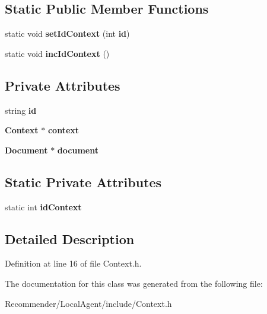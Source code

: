 \subsection*{Static Public Member Functions}
\begin{CompactItemize}
\item 
static void \textbf{setIdContext} (int {\bf id})\label{classbr_1_1ufscar_1_1lince_1_1ginga_1_1recommender_1_1Context_8450c7ac7b36d83513acd3d2ec94457c}

\item 
static void \textbf{incIdContext} ()\label{classbr_1_1ufscar_1_1lince_1_1ginga_1_1recommender_1_1Context_d6d7a38af7e7c56f8d877a2143e00abf}

\end{CompactItemize}
\subsection*{Private Attributes}
\begin{CompactItemize}
\item 
string {\bf id}\label{classbr_1_1ufscar_1_1lince_1_1ginga_1_1recommender_1_1Context_d97b05b88ce9080f35b157cfacc8eb69}

\item 
{\bf Context} $\ast$ {\bf context}\label{classbr_1_1ufscar_1_1lince_1_1ginga_1_1recommender_1_1Context_a254a98e2e3d77626823cad539eced2b}

\item 
{\bf Document} $\ast$ {\bf document}\label{classbr_1_1ufscar_1_1lince_1_1ginga_1_1recommender_1_1Context_a25c3b1ddc44ed56c59d5c70879ec5f4}

\end{CompactItemize}
\subsection*{Static Private Attributes}
\begin{CompactItemize}
\item 
static int {\bf idContext}\label{classbr_1_1ufscar_1_1lince_1_1ginga_1_1recommender_1_1Context_d67cb9279f6f7eb644c785090a78f242}

\end{CompactItemize}


\subsection{Detailed Description}




Definition at line 16 of file Context.h.

The documentation for this class was generated from the following file:\begin{CompactItemize}
\item 
Recommender/LocalAgent/include/Context.h\end{CompactItemize}
